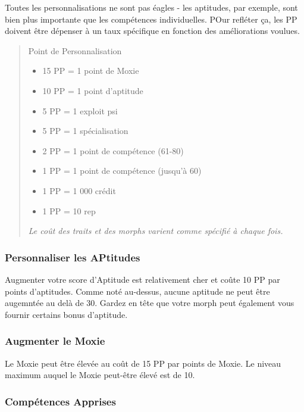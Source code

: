 Toutes les personnalisations ne sont pas éagles - les aptitudes, par exemple, sont bien plus importante que les compétences individuelles. POur refléter ça, les PP doivent être dépenser à un taux spécifique en fonction des améliorations voulues. 

\begin{quotation} Point de Personnalisation \begin{itemize} \item 15 PP = 1 point de Moxie \item 10 PP = 1 point d'aptitude \item 5 PP = 1 exploit psi \item 5 PP = 1 spécialisation \item 2 PP = 1 point de compétence (61-80) \item 1 PP = 1 point de compétence (jusqu'à 60) \item 1 PP = 1 000 crédit \item 1 PP = 10 rep \end{itemize} \textit{ Le coût des traits et des morphs varient comme spécifié à chaque fois.} \end{quotation} 

\subsubsection{Personnaliser les APtitudes} \label{sec:customizing-aptitudes} 

Augmenter votre score d'Aptitude est relativement cher et coûte 10 PP par points d'aptitudes. Comme noté au-dessus, aucune aptitude ne peut être augemntée au delà de 30. Gardez en tête que votre morph peut également vous fournir certains bonus d'aptitude. 

\subsubsection{Augmenter le Moxie} \label{sec:increasing-moxie} 

Le Moxie peut être élevée au coût de 15 PP par points de Moxie. Le niveau maximum auquel le Moxie peut-être élevé est de 10. 

\subsubsection{Compétences Apprises} \label{sec:buying-learned-skills} 


